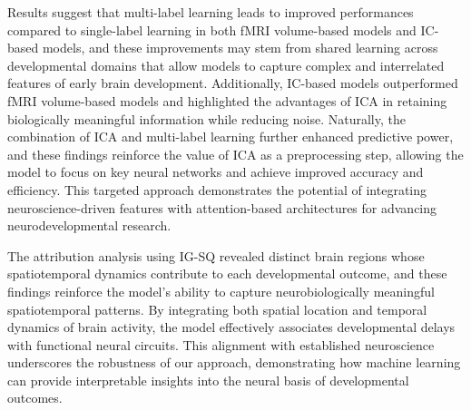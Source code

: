 \documentclass[runningheads,a4paper]{llncs}
\begin{document}
Results suggest that multi-label learning leads to improved performances compared to single-label learning in both fMRI volume-based models and IC-based models, and these improvements may stem from shared learning across developmental domains that allow models to capture complex and interrelated features of early brain development. Additionally, IC-based models outperformed fMRI volume-based models and highlighted the advantages of ICA in retaining biologically meaningful information while reducing noise. Naturally, the combination of ICA and multi-label learning further enhanced predictive power, and these findings reinforce the value of ICA as a preprocessing step, allowing the model to focus on key neural networks and achieve improved accuracy and efficiency. This targeted approach demonstrates the potential of integrating neuroscience-driven features with attention-based architectures for advancing neurodevelopmental research.
%

The attribution analysis using IG-SQ revealed distinct brain regions whose spatiotemporal dynamics contribute to each developmental outcome, and these findings reinforce the model's ability to capture neurobiologically meaningful spatiotemporal patterns. By integrating both spatial location and temporal dynamics of brain activity, the model effectively associates developmental delays with functional neural circuits. This alignment with established neuroscience underscores the robustness of our approach, demonstrating how machine learning can provide interpretable insights into the neural basis of developmental outcomes.
\end{document}
